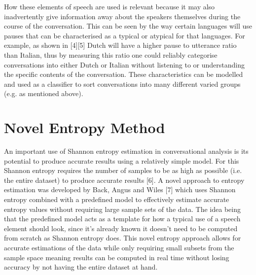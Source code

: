 How these elements of speech are used is relevant because it may also inadvertently give information away about the speakers themselves during the course of the conversation. This can be seen by the way certain languages will use pauses that can be characterised as a typical or atypical for that languages. For example, as shown in [4][5] Dutch will have a higher pause to utterance ratio than Italian, thus by measuring this ratio one could reliably categorise conversations into either Dutch or Italian without listening to or understanding the specific contents of the conversation. These characteristics can be modelled and used as a classifier to sort conversations into many different varied groups (e.g. as mentioned above). 




\section{Novel Entropy Method}
An important use of Shannon entropy estimation in conversational analysis is its potential to produce accurate results using a relatively simple model. For this Shannon entropy requires the number of samples to be as high as possible (i.e. the entire dataset) to produce accurate results [6]. A novel approach to entropy estimation was developed by Back, Angus and Wiles [7] which uses Shannon entropy combined with a predefined model to effectively estimate accurate entropy values without requiring large sample sets of the data. The idea being that the predefined model acts as a template for how a typical use of a speech element should look, since it's already known it doesn't need to be computed from scratch as Shannon entropy does. This novel entropy approach allows for accurate estimations of the data while only requiring small subsets from the sample space meaning results can be computed in real time without losing accuracy by not having the entire dataset at hand. 

